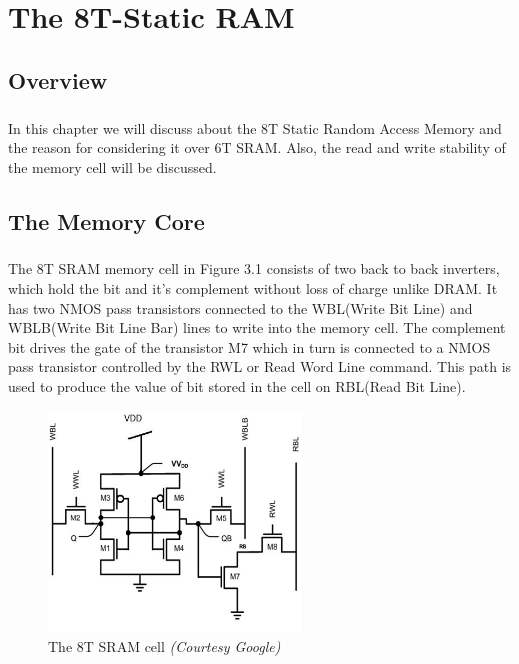 %
%
\let\textcircled=\pgftextcircled
\chapter{The 8T-Static RAM}
\label{chap:sram_about}

\section{Overview}

\paragraph{}
In this chapter we will discuss about the 8T Static Random Access Memory and the reason for considering it over 6T SRAM. Also, the read and write stability of the memory cell will be discussed.

\section{The Memory Core}
\paragraph{}

The 8T SRAM memory cell in Figure 3.1 consists of two back to back inverters, which hold the bit and it's complement without loss of charge unlike DRAM. It has two NMOS pass transistors connected to the WBL(Write Bit Line) and WBLB(Write Bit Line Bar) lines to write into the memory cell. The complement bit drives the gate of the transistor M7 which in turn is connected to a NMOS pass transistor controlled by the RWL or Read Word Line command. This path is used to produce the value of bit stored in the cell on RBL(Read Bit Line).
\begin{figure}[H]
\centering
\includegraphics[width=0.6\textwidth]{chapters/chapter03/sram_actual1.png}
\caption{The 8T SRAM cell \emph{(Courtesy Google)}}
\label{fig:Figure}
\end{figure}

